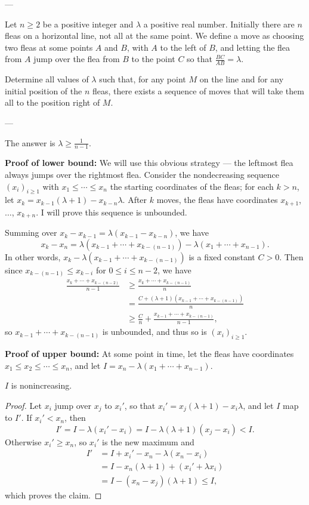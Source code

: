 
---

Let $n\ge2$ be a positive integer and $\lambda$ a positive real number. Initially there are $n$ fleas on a horizontal line, not all at the same point. We define a move as choosing two fleas at some points $A$ and $B$, with $A$ to the left of $B$, and letting the flea from $A$ jump over the flea from $B$ to the point $C$ so that $\frac{BC}{AB}=\lambda$.

Determine all values of $\lambda$ such that, for any point $M$ on the line and for any initial position of the $n$ fleas, there exists a sequence of moves that will take them all to the position right of $M$.

---

The answer is $\lambda\ge\frac1{n-1}$.

\bigskip

\textbf{Proof of lower bound:} We will use this obvious strategy --- the leftmost flea always jumps over the rightmost flea. Consider the nondecreasing sequence $(x_i)_{i\ge1}$ with $x_1\le\cdots\le x_n$ the starting coordinates of the fleas; for each $k>n$, let $x_k=x_{k-1}(\lambda+1)-x_{k-n}\lambda$. After $k$ moves, the fleas have coordinates $x_{k+1}$, $\ldots$, $x_{k+n}$. I will prove this sequence is unbounded.

Summing over $x_k-x_{k-1}=\lambda(x_{k-1}-x_{k-n})$, we have \[x_k-x_n=\lambda\left(x_{k-1}+\cdots+x_{k-(n-1)}\right)-\lambda(x_1+\cdots+x_{n-1}).\]
In other words, $x_k-\lambda\left(x_{k-1}+\cdots+x_{k-(n-1)}\right)$ is a fixed constant $C>0$. Then since $x_{k-(n-1)}\le x_{k-i}$ for $0\le i\le n-2$, we have
\begin{align*}
    \frac{x_k+\cdots+x_{k-(n-2)}}{n-1}&\ge\frac{x_k+\cdots+x_{k-(n-1)}}n\\
    &=\frac{C+(\lambda+1)\left(x_{k-1}+\cdots+x_{k-(n-1)}\right)}n\\
    &\ge\frac Cn+\frac{x_{k-1}+\cdots+x_{k-(n-1)}}{n-1},
\end{align*}
so $x_{k-1}+\cdots+x_{k-(n-1)}$ is unbounded, and thus so is $(x_i)_{i\ge1}$.

\bigskip

\textbf{Proof of upper bound:} At some point in time, let the fleas have coordinates $x_1\le x_2\le\cdots\le x_n$, and let $I=x_n-\lambda(x_1+\cdots+x_{n-1})$.
\begin{iclaim*}
    $I$ is nonincreasing.
\end{iclaim*}
\begin{proof}
    Let $x_i$ jump over $x_j$ to $x_i'$, so that $x_i'=x_j(\lambda+1)-x_i\lambda$, and let $I$ map to $I'$. If $x_i'<x_n$, then \[I'=I-\lambda(x_i'-x_i)=I-\lambda(\lambda+1)(x_j-x_i)<I.\]
    Otherwise $x_i'\ge x_n$, so $x_i'$ is the new maximum and
    \begin{align*}
        I'&=I+x_i'-x_n-\lambda(x_n-x_i)\\
        &=I-x_n(\lambda+1)+(x_i'+\lambda x_i)\\
        &=I-(x_n-x_j)(\lambda+1)\le I,
    \end{align*}
    which proves the claim.
\end{proof}

